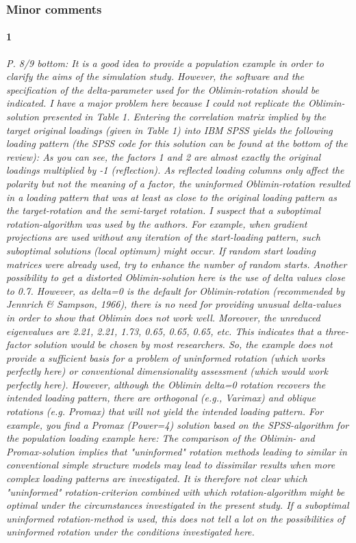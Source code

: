 \documentclass[a4paper]{article}
\begin{document}
\subsubsection*{Minor comments}

\paragraph{1} \textit{P. 8/9 bottom: It is a good idea to provide a population example in order to clarify the aims of the simulation study. However, the software and the specification of the delta-parameter used for the Oblimin-rotation should be indicated. I have a major problem here because I could not replicate the Oblimin-solution presented in Table 1. Entering the correlation matrix implied by the target original loadings (given in Table 1) into IBM SPSS yields the following loading pattern (the SPSS code for this solution can be found at the bottom of the review):
As you can see, the factors 1 and 2 are almost exactly the original loadings multiplied by -1 (reflection). As reflected loading columns only affect the polarity but not the meaning of a factor, the uninformed Oblimin-rotation resulted in a loading pattern that was at least as close to the original loading pattern as the target-rotation and the semi-target rotation. I suspect that a suboptimal rotation-algorithm was used by the authors. For example, when gradient projections are used without any iteration of the start-loading pattern, such suboptimal solutions (local optimum) might occur. If random start loading matrices were already used, try to enhance the number of random starts. Another possibility to get a distorted Oblimin-solution here is the use of delta values close to 0.7. However, as delta=0 is the default for Oblimin-rotation (recommended by Jennrich \& Sampson, 1966), there is no need for providing unusual delta-values in order to show that Oblimin does not work well.
Moreover, the unreduced eigenvalues are 2.21, 2.21, 1.73, 0.65, 0.65, 0.65, etc. This indicates that a three-factor solution would be chosen by most researchers. So, the example does not provide a sufficient basis for a problem of uninformed rotation (which works perfectly here) or conventional dimensionality assessment (which would work perfectly here).
However, although the Oblimin delta=0 rotation recovers the intended loading pattern, there are orthogonal (e.g., Varimax) and oblique rotations (e.g. Promax) that will not yield the intended loading pattern. For example, you find a Promax (Power=4) solution based on the SPSS-algorithm for the population loading example here: The comparison of the Oblimin- and Promax-solution implies that "uninformed" rotation methods leading to similar in conventional simple structure models may lead to dissimilar results when more complex loading patterns are investigated. It is therefore not clear which "uninformed" rotation-criterion combined with which rotation-algorithm might be optimal under the circumstances investigated in the present study. If a suboptimal uninformed rotation-method is used, this does not tell a lot on the possibilities of uninformed rotation under the conditions investigated here.}
\end{document}
